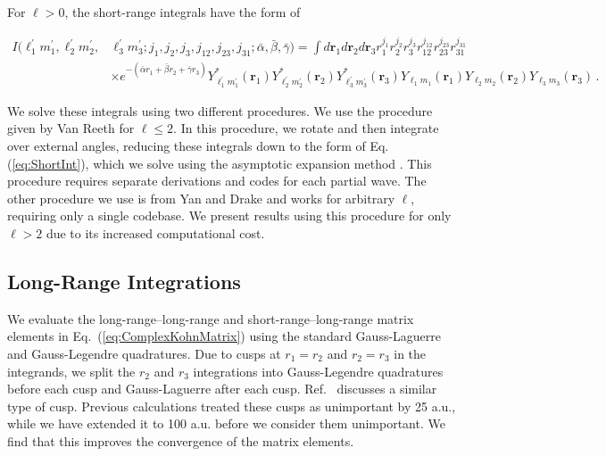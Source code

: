 \documentclass[preprint,showpacs,showkeys,preprintnumbers,amsmath,amssymb,longbibliography,pra,aps]{revtex4-1}
\begin{document}
{For $\ell > 0$, the short-range integrals have the form of
\begin{widetext}
\begin{align}
\label{eq:ShortIntGen}
\nonumber I(\ell_1^\prime m_1^\prime, \ell_2^\prime m_2^\prime, &\ell_3^\prime m_3^\prime; j_1,j_2,j_3,j_{12},j_{23},j_{31}; \bar{\alpha}, \bar{\beta}, \bar{\gamma}) = \int d \textbf{r}_1 d \textbf{r}_2 d \textbf{r}_3
r_1^{j_1} r_2^{j_2} r_3^{j_3} r_{12}^{j_{12}}
r_{23}^{j_{23}} r_{31}^{j_{31}} \\
& \times e^{-(\bar{\alpha} r_1 + \bar{\beta} r_2 + \bar{\gamma} r_3)}
Y_{\ell_1^\prime m_1^\prime}^* (\textbf{r}_1) Y_{\ell_2^\prime m_2^\prime}^* (\textbf{r}_2) Y_{\ell_3^\prime m_3^\prime}^* (\textbf{r}_3) Y_{\ell_1 m_1} (\textbf{r}_1) Y_{\ell_2 m_2} (\textbf{r}_2) Y_{\ell_3 m_3} (\textbf{r}_3)\, .
\end{align}
\end{widetext}
We solve these integrals using two different procedures.
We use the procedure given by Van Reeth \cite{VanReethThesis}
for $\ell \leq 2$. In this 
procedure, we rotate and then integrate over external angles, reducing these 
integrals down to the form of Eq. (\ref{eq:ShortInt}), which we solve using
the asymptotic expansion method \cite{Drake1995}.
This procedure requires separate derivations and codes
for each partial wave. The other procedure we use
is from Yan and Drake \cite{Yan1997}
and works for arbitrary $\ell$, requiring only a single codebase.
We present results using this procedure for only $\ell > 2$ due
to its increased computational cost.

\subsection{Long-Range Integrations}
\label{sec:LongInt}
We evaluate the long-range--long-range and short-range--long-range matrix 
elements in Eq.~(\ref{eq:ComplexKohnMatrix}) using the standard Gauss-Laguerre
and Gauss-Legendre quadratures. Due to cusps at $r_1 = r_2$ and
$r_2 = r_3$ in the integrands, we split the $r_2$ and $r_3$ integrations into 
Gauss-Legendre quadratures before each cusp and Gauss-Laguerre after each cusp.
Ref.~\cite{Armour1991} discusses a similar type of cusp.
Previous calculations \cite{VanReeth2003,VanReeth2004} treated these cusps as 
unimportant by 25 a.u., while we have extended it to 100 a.u. before we consider 
them unimportant. We find that this improves the convergence of the matrix 
elements.

}
\end{document}
